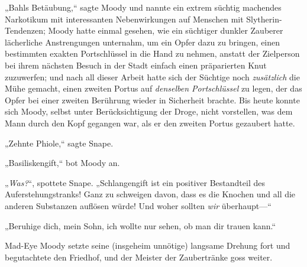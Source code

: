 „Bahls Betäubung,“ sagte Moody und nannte ein extrem süchtig machendes Narkotikum mit interessanten Nebenwirkungen auf Menschen mit Slytherin-Tendenzen; Moody hatte einmal gesehen, wie ein süchtiger dunkler Zauberer lächerliche Anstrengungen unternahm, um ein Opfer dazu zu bringen, einen bestimmten exakten Portschlüssel in die Hand zu nehmen, anstatt der Zielperson bei ihrem nächsten Besuch in der Stadt einfach einen präparierten Knut zuzuwerfen; und nach all dieser Arbeit hatte sich der Süchtige noch \emph{zusätzlich} die Mühe gemacht, einen zweiten Portus auf \emph{denselben Portschlüssel} zu legen, der das Opfer bei einer zweiten Berührung wieder in Sicherheit brachte. Bis heute konnte sich Moody, selbst unter Berücksichtigung der Droge, nicht vorstellen, was dem Mann durch den Kopf gegangen war, als er den zweiten Portus gezaubert hatte.

„Zehnte Phiole,“ sagte Snape.

„Basiliskengift,“ bot Moody an.

„\emph{Was?}“, spottete Snape. „Schlangengift ist ein positiver Bestandteil des Auferstehungstranks! Ganz zu schweigen davon, dass es die Knochen und all die anderen Substanzen auflösen würde! Und woher sollten \emph{wir} überhaupt—“

„Beruhige dich, mein Sohn, ich wollte nur sehen, ob man dir trauen kann.“

Mad-Eye Moody setzte seine (insgeheim unnötige) langsame Drehung fort und begutachtete den Friedhof, und der Meister der Zaubertränke goss weiter.

